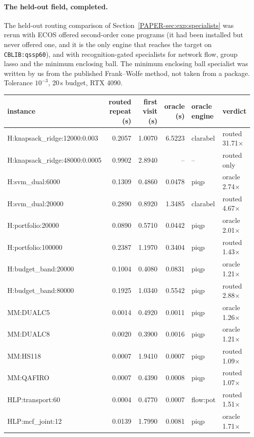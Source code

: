 \documentclass[11pt]{article}
\begin{document}
\paragraph{The held-out field, completed.}
The held-out routing comparison of Section~\ref{PAPER-sec:exp:specialists} was rerun
with ECOS offered second-order cone programs (it had been installed but never
offered one, and it is the only engine that reaches the target on
\texttt{CBLIB:qssp60}), and with recognition-gated specialists for network
flow, group lasso and the minimum enclosing ball. The minimum enclosing ball
specialist was written by us from the published Frank--Wolfe method, not taken
from a package. Tolerance $10^{-3}$, 20\,s budget, RTX 4090.

\begin{center}
\scriptsize
\begin{tabular}{lrrrll}
\toprule
instance & routed repeat (s) & first visit (s) & oracle (s) & oracle engine & verdict \\
\midrule
H:knapsack\_ridge:12000:0.003 & 0.2057 & 1.0070 & 6.5223 & clarabel & routed 31.71$\times$ \\
H:knapsack\_ridge:48000:0.0005 & 0.9902 & 2.8940 & -- & -- & routed only \\
H:svm\_dual:6000 & 0.1309 & 0.4860 & 0.0478 & piqp & oracle 2.74$\times$ \\
H:svm\_dual:20000 & 0.2890 & 0.8920 & 1.3485 & clarabel & routed 4.67$\times$ \\
H:portfolio:20000 & 0.0890 & 0.5710 & 0.0442 & piqp & oracle 2.01$\times$ \\
H:portfolio:100000 & 0.2387 & 1.1970 & 0.3404 & piqp & routed 1.43$\times$ \\
H:budget\_band:20000 & 0.1004 & 0.4080 & 0.0831 & piqp & oracle 1.21$\times$ \\
H:budget\_band:80000 & 0.1925 & 1.0340 & 0.5542 & piqp & routed 2.88$\times$ \\
MM:DUALC5 & 0.0014 & 0.4920 & 0.0011 & piqp & oracle 1.26$\times$ \\
MM:DUALC8 & 0.0020 & 0.3900 & 0.0016 & piqp & oracle 1.21$\times$ \\
MM:HS118 & 0.0007 & 1.9410 & 0.0007 & piqp & routed 1.09$\times$ \\
MM:QAFIRO & 0.0007 & 0.4390 & 0.0008 & piqp & routed 1.07$\times$ \\
HLP:transport:60 & 0.0004 & 0.4770 & 0.0007 & flow:pot & routed 1.51$\times$ \\
HLP:mcf\_joint:12 & 0.0139 & 1.7990 & 0.0081 & piqp & oracle 1.71$\times$ \\

\end{tabular}
\end{center}
\end{document}
